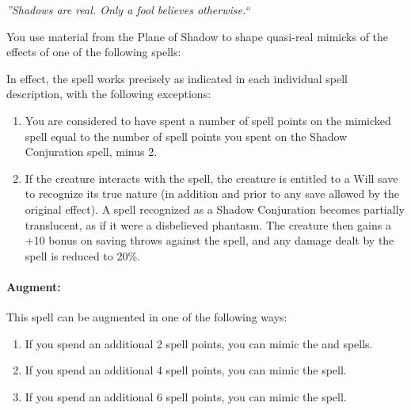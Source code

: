 \emph{''Shadows are real. Only a fool believes otherwise.``}

You use material from the Plane of Shadow to shape quasi-real mimicks of the effects of one of the following spells:
\begin{list}{}{\leftmargin=1em}
 \item {}
 \item {}
 \item {}
 \item {}
 \item {}
 \item {}
\end{list}
In effect, the spell works precisely as indicated in each individual spell description, with the following exceptions:
\begin{enumerate}
 \item You are considered to have spent a number of spell points on the mimicked spell equal to the number of spell
 points you spent on the Shadow Conjuration spell, minus 2.
 \item If the creature interacts with the spell, the creature is entitled to a Will save to recognize its true nature (in addition and prior to
 any save allowed by the original effect).
 A spell recognized as a Shadow Conjuration becomes partially translucent, as if it were a disbelieved phantasm.
 The creature then gains a +10 bonus on saving throws against the spell, and any damage dealt by the spell is reduced to 20\%.
\end{enumerate}

\paragraph{Augment:} This spell can be augmented in one of the following ways:
\begin{enumerate}
 \item If you spend an additional 2 spell points, you can mimic the  and  spells.
 \item If you spend an additional 4 spell points, you can mimic the  spell.
 \item If you spend an additional 6 spell points, you can mimic the  spell.
\end{enumerate}

